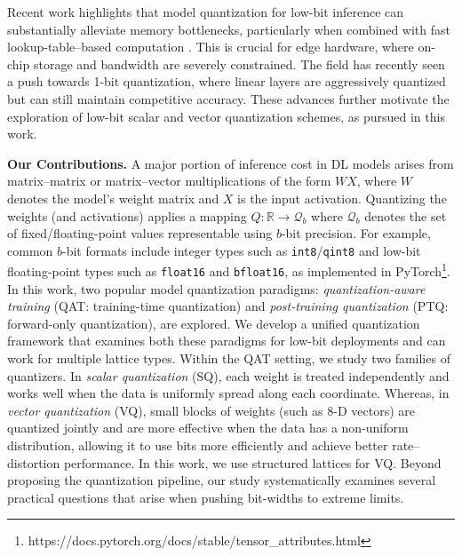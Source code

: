 \documentclass{article}
\theoremstyle{definition}
\theoremstyle{remark}
\begin{document}
Recent work highlights that model quantization for low-bit inference can substantially alleviate memory bottlenecks, particularly when combined with fast lookup-table–based computation \cite{hnlq}. This is crucial for edge hardware, where on-chip storage and bandwidth are severely constrained. The field has recently seen a push towards 1-bit \cite{wang2023bitnet} quantization, where linear layers are aggressively quantized but can still maintain competitive accuracy. These advances further motivate the exploration of low-bit scalar and vector quantization schemes, as pursued in this work.

\noindent \textbf{Our Contributions.} A major portion of inference cost in DL models arises from matrix–matrix or matrix–vector multiplications of the form $WX$, where $W$ denotes the model's weight matrix and $X$ is the input activation. Quantizing the weights (and activations) applies a mapping $Q: \mathbb{R} \rightarrow \mathcal{Q}_b$ where $\mathcal{Q}_b$ denotes the set of fixed/floating-point values representable using $b$-bit precision. For example, common $b$-bit formats include integer types such as \texttt{int8}/\texttt{qint8} and low-bit floating-point types such as 
\texttt{float16} and \texttt{bfloat16}, as implemented in PyTorch\footnote{https://docs.pytorch.org/docs/stable/tensor\_attributes.html}. In this work, two popular model quantization paradigms: \textit{quantization-aware training} (QAT: training-time quantization) and \textit{post-training quantization} (PTQ:  forward-only quantization), are explored. We develop a unified quantization framework that examines both these paradigms for low-bit deployments and can work for multiple lattice types. Within the QAT setting, we study two families of quantizers. In \textit{scalar quantization} (SQ), each weight is treated independently and works well when the data is uniformly spread along each coordinate. Whereas, in \textit{vector quantization} (VQ), small blocks of weights (such as 8-D vectors) are quantized jointly and are more effective when the data has a non-uniform distribution, allowing it to use bits more efficiently and achieve better rate–distortion performance. In this work, we use structured lattices for VQ. Beyond proposing the quantization pipeline, our study systematically examines several practical questions that arise when pushing bit-widths to extreme limits. 
\vspace{-0.40cm}
\end{document}
